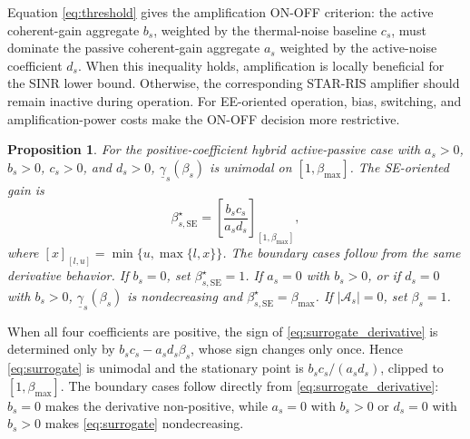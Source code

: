\documentclass[journal]{IEEEtran}
\newtheorem{proposition}{Proposition}
\begin{document}
Equation \eqref{eq:threshold} gives the amplification ON-OFF criterion: the active coherent-gain aggregate $b_s$, weighted by the thermal-noise baseline $c_s$, must dominate the passive coherent-gain aggregate $a_s$ weighted by the active-noise coefficient $d_s$. When this inequality holds, amplification is locally beneficial for the SINR lower bound. Otherwise, the corresponding STAR-RIS amplifier should remain inactive during operation. For EE-oriented operation, bias, switching, and amplification-power costs make the ON-OFF decision more restrictive.

\begin{proposition}\label{prop:se_optimal}
For the positive-coefficient hybrid active-passive case with $a_s>0$, $b_s>0$, $c_s>0$, and $d_s>0$, $\underline{\gamma}_s(\beta_s)$ is unimodal on $[1,\beta_{\max}]$. The SE-oriented gain is
\begin{equation}
\beta_{s,\mathrm{SE}}^\star=
\left[\frac{b_sc_s}{a_sd_s}\right]_{[1,\beta_{\max}]},
\label{eq:beta_closed}
\end{equation}
where $[x]_{[l,u]}=\min\{u,\max\{l,x\}\}$. The boundary cases follow from the same derivative behavior. If $b_s=0$, set $\beta_{s,\mathrm{SE}}^\star=1$. If $a_s=0$ with $b_s>0$, or if $d_s=0$ with $b_s>0$, $\underline{\gamma}_s(\beta_s)$ is nondecreasing and $\beta_{s,\mathrm{SE}}^\star=\beta_{\max}$. If $|\mathcal{A}_s|=0$, set $\beta_s=1$.
\end{proposition}

\begin{IEEEproof}
When all four coefficients are positive, the sign of \eqref{eq:surrogate_derivative} is determined only by $b_sc_s-a_sd_s\beta_s$, whose sign changes only once. Hence \eqref{eq:surrogate} is unimodal and the stationary point is $b_sc_s/(a_sd_s)$, clipped to $[1,\beta_{\max}]$. The boundary cases follow directly from \eqref{eq:surrogate_derivative}: $b_s=0$ makes the derivative non-positive, while $a_s=0$ with $b_s>0$ or $d_s=0$ with $b_s>0$ makes \eqref{eq:surrogate} nondecreasing.
\end{IEEEproof}
\end{document}
